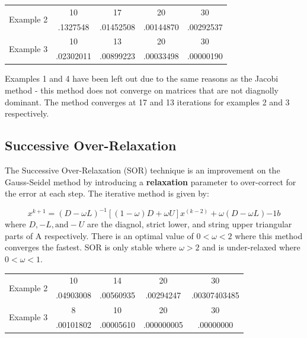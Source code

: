 \documentclass[11pt]{article}	%
\begin{document}
\begin{center}
	 \label{tab:title}
    \begin{tabular}{||c|c|c|c|c||}
        \hline
        \multirow{2}{5em}{Example 2} & 10 & 17 & 20 & 30 \\ [.25em]
        & .1327548 & .01452508 & .00144870 & .00292537 \\ [.25em]
        \hline \hline
        \multirow{2}{5em}{Example 3} & 10 & 13 & 20 & 30 \\ [.25em]
        & .02302011 & .00899223 & .00033498 & .00000190 \\ [.25em]
        \hline
    \end{tabular}
\end{center}
Examples 1 and 4 have been left out due to the same reasons as the Jacobi method - this method does not converge on matrices that are not diagnolly dominant. The method converges at 17 and 13 iterations for examples 2 and 3 respectively.

\subsection{Successive Over-Relaxation}
The Successive Over-Relaxation (SOR) technique is an improvement on the Gauss-Seidel method by introducing a \textbf{relaxation} parameter to over-correct for the error at each step. The iterative method is given by:

\begin{equation}\label{eq:successive-over-relax-eq-1}
    x^{k+1} = (D - \omega L)^{-1}[(1 - \omega)D + \omega U]x^{(k-2)} + \omega(D - \omega L){-1}b
\end{equation}
where $D, -L, \textrm{and} -U$ are the diagnol, strict lower, and string upper triangular parts of A respectively. There is an optimal value of $0 < \omega < 2$ where this method converges the fastest. SOR is only stable where $\omega > 2$ and is under-relaxed where $0 < \omega < 1$.

\begin{center}
	 \label{tab:title}
    \begin{tabular}{||c|c|c|c|c||}
        \hline
        \multirow{2}{5em}{Example 2} & 10 & 14 &  20 & 30 \\ [.25em]
        & .04903008 & .00560935 & .00294247 & .00307403485 \\ [.25em]
        \hline\hline
        \multirow{2}{5em}{Example 3} & 8 & 10 & 20 & 30 \\ [.25em]
        & .00101802 & .00005610 & .000000005 & .00000000 \\ [.25em]
        \hline
    \end{tabular}
\end{center}
\end{document}
